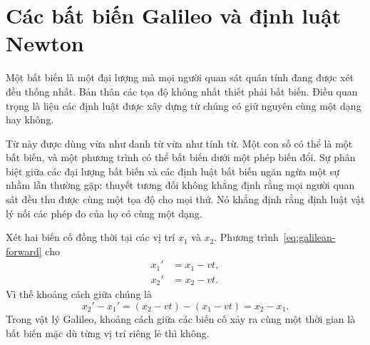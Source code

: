 \begin{classroomqa}
\end{classroomqa}

\section{Các bất biến Galileo và định luật Newton}

Một bất biến là một đại lượng mà mọi người quan sát quán tính đang được xét đều thống nhất. Bản thân các tọa độ không nhất thiết phải bất biến. Điều quan trọng là liệu các định luật được xây dựng từ chúng có giữ nguyên cùng một dạng hay không.

Từ này được dùng vừa như danh từ vừa như tính từ. Một con số có thể là một bất biến, và một phương trình có thể bất biến dưới một phép biến đổi. Sự phân biệt giữa các đại lượng bất biến và các định luật bất biến ngăn ngừa một sự nhầm lẫn thường gặp: thuyết tương đối không khẳng định rằng mọi người quan sát đều thu được cùng một tọa độ cho mọi thứ. Nó khẳng định rằng định luật vật lý nối các phép đo của họ có cùng một dạng.

Xét hai biến cố đồng thời tại các vị trí \(x_1\) và \(x_2\). Phương trình~\eqref{eq:galilean-forward} cho
\begin{align}
x_1'&=x_1-vt,\\
x_2'&=x_2-vt.
\end{align}
Vì thế khoảng cách giữa chúng là
\begin{equation}
x_2'-x_1'=(x_2-vt)-(x_1-vt)=x_2-x_1.
\end{equation}
Trong vật lý Galileo, khoảng cách giữa các biến cố xảy ra cùng một thời gian là bất biến mặc dù từng vị trí riêng lẻ thì không.

